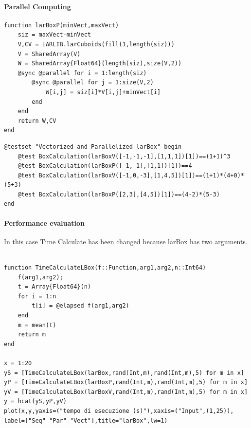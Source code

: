 \documentclass{article}
\begin{document}
\paragraph{Parallel Computing}
\begin{Verbatim}
function larBoxP(minVect,maxVect)
    siz = maxVect-minVect
    V,CV = LARLIB.larCuboids(fill(1,length(siz)))
    V = SharedArray(V)
    W = SharedArray{Float64}(length(siz),size(V,2))
    @sync @parallel for i = 1:length(siz)
        @sync @parallel for j = 1:size(V,2)
            W[i,j] = siz[i]*V[i,j]+minVect[i]
        end
    end
    return W,CV
end
\end{Verbatim}

\begin{Verbatim}
@testset "Vectorized and Parallelized larBox" begin
	@test BoxCalculation(larBoxV([-1,-1,-1],[1,1,1])[1])==(1+1)^3
	@test BoxCalculation(larBoxP([-1,-1],[1,1])[1])==4
	@test BoxCalculation(larBoxV([-1,0,-3],[1,4,5])[1])==(1+1)*(4+0)*(5+3)
	@test BoxCalculation(larBoxP([2,3],[4,5])[1])==(4-2)*(5-3)
end
\end{Verbatim}

\paragraph{Performance evaluation\\}

In this case Time Calculate has been changed because larBox has two arguments.

\begin{Verbatim}

function TimeCalculateLBox(f::Function,arg1,arg2,n::Int64)
    f(arg1,arg2);
    t = Array{Float64}(n)
    for i = 1:n
        t[i] = @elapsed f(arg1,arg2)
    end
    m = mean(t)
    return m
end

x = 1:20
yS = [TimeCalculateLBox(larBox,rand(Int,m),rand(Int,m),5) for m in x]
yP = [TimeCalculateLBox(larBoxP,rand(Int,m),rand(Int,m),5) for m in x]
yV = [TimeCalculateLBox(larBoxV,rand(Int,m),rand(Int,m),5) for m in x]
y = hcat(yS,yP,yV)
plot(x,y,yaxis=("tempo di esecuzione (s)"),xaxis=("Input",(1,25)),
label=["Seq" "Par" "Vect"],title="larBox",lw=1)

\end{Verbatim}
\end{document}

